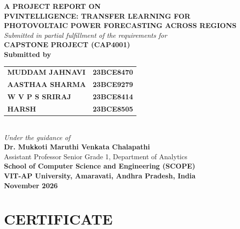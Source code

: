 \documentclass[12pt,a4paper,oneside]{report}
\begin{document}
\begin{titlepage}
\centering
\vspace*{0.5cm}
{\Large \textbf{A PROJECT REPORT ON}}\\[0.8cm]

{\LARGE \textbf{PVINTELLIGENCE: TRANSFER LEARNING FOR PHOTOVOLTAIC POWER FORECASTING ACROSS REGIONS}}\\[1.2cm]

{\large \textit{Submitted in partial fulfillment of the requirements for}}\\[0.3cm]
{\Large \textbf{CAPSTONE PROJECT (CAP4001)}}\\[1.2cm]

{\large \textbf{Submitted by}}\\[0.4cm]
\begin{tabular}{ll}
\textbf{MUDDAM JAHNAVI} & \textbf{23BCE8470} \\
\textbf{AASTHAA SHARMA} & \textbf{23BCE9279} \\
\textbf{W V P S SRIRAJ} & \textbf{23BCE8414} \\
\textbf{HARSH} & \textbf{23BCE8505} \\
\end{tabular}\\[1.2cm]

{\large \textit{Under the guidance of}}\\[0.3cm]
{\Large \textbf{Dr. Mukkoti Maruthi Venkata Chalapathi}}\\[0.2cm]
{\normalsize Assistant Professor Senior Grade 1, Department of Analytics}\\[1.5cm]

\vfill
{\Large \textbf{School of Computer Science and Engineering (SCOPE)}}\\[0.3cm]
{\large \textbf{VIT-AP University, Amaravati, Andhra Pradesh, India}}\\[0.3cm]
{\large \textbf{November 2026}}
\end{titlepage}

\newpage
\chapter*{CERTIFICATE}
\thispagestyle{empty}
\end{document}
